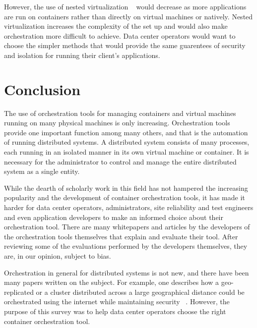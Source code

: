 \documentclass[10pt,twocolumn]{article}
\begin{document}
However, the use of nested virtualization ~\cite{nested} would decrease as more applications are run on containers rather than directly on virtual machines or natively.
Nested virtualization increases the complexity of the set up and would also make orchestration more difficult to achieve.
Data center operators would want to choose the simpler methods that would provide the same guarentees of security and isolation for running their client's applications.

\section{Conclusion}

The use of orchestration tools for managing containers and virtual machines running on many physical machines is only increasing.
Orchestration tools provide one important function among many others, and that is the automation of running distributed systems.
A distributed system consists of many processes, each running in an isolated manner in its own virtual machine or container.
It is necessary for the administrator to control and manage the entire distributed system as a single entity.

While the dearth of scholarly work in this field has not hampered the increasing popularity and the development of container orchestration tools, it has made it harder for data center operators, administrators, site reliability and test engineers and even application developers to make an informed choice about their orchestration tool.
There are many whitepapers and articles by the developers of the orchestration tools themselves that explain and evaluate their tool.
After reviewing some of the evaluations performed by the developers themselves, they are, in our opinion, subject to bias.

Orchestration in general for distributed systems is not new, and there have been many papers written on the subject.
For example, one describes how a geo-replicated or a cluster distributed across a large geographical distance could be orchestrated using the internet while maintaining security ~\cite{intro_orchestration}.
However, the purpose of this survey was to help data center operators choose the right container orchestration tool.



\end{document}
